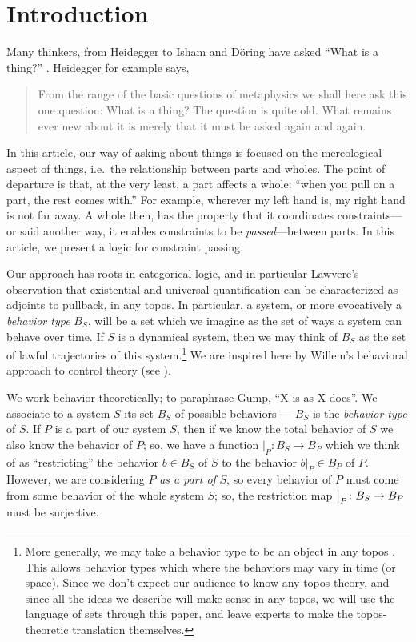 
\section{Introduction}

Many thinkers, from Heidegger to Isham and D\"{o}ring have asked ``What is a thing?'' \cite{heidegger1972thing, doring2010thing}. Heidegger for example says,
\begin{quote}
    From the range of the basic questions of metaphysics we shall here ask this one question: What is a thing? The question is quite old. What remains ever new about it is merely that it must be asked again and again.
\end{quote}
In this article, our way of asking about things is focused on the mereological aspect of things, i.e.\ the relationship between parts and wholes. The point of departure is that, at the very least, a part affects a whole: ``when you pull on a part, the rest comes with.'' For example, wherever my left hand is, my right hand is not far away. A whole then, has the property that it coordinates constraints---or said another way, it enables constraints to be \emph{passed}---between parts. In this article, we present a logic for constraint passing.

Our approach has roots in categorical logic, and in particular Lawvere's
observation that existential and universal quantification can be characterized
as adjoints to pullback, in any topos. In particular, a system, or more
evocatively a \emph{behavior type} $B_S$, will be a set which we imagine as the
set of ways a system can behave over time. If $S$ is a dynamical system, then we
may think of $B_S$ as the set of lawful trajectories of this system.\footnote{More generally, we may take a behavior type to be an object in
  any topos \cite{MacLane.Moerdijk:1992a}. This allows behavior types which
  where the behaviors may vary in time (or space). Since we don't expect our
  audience to know any topos theory, and since all the ideas we describe will
  make sense in any topos, we will use the language of sets through this paper,
  and leave experts to make the topos-theoretic translation themselves.} We are
inspired here by Willem's behavioral approach to control theory (see \cites{Willems:1998a}{Willems:2007a}{Willems.Polderman:2013a}).

We work behavior-theoretically; to paraphrase Gump, ``X is as X does''. We
associate to a system $S$ its set $B_S$ of possible behaviors --- $B_S$ is the
\emph{behavior type} of $S$. If $P$ is a part
of our system $S$, then if we know the total behavior of $S$ we also know the
behavior of $P$; so, we have a function $|_P : B_S \to B_P$ which we think of as
``restricting'' the behavior $b \in B_S$ of $S$ to the behavior $b|_P \in B_P$
of $P$. However, we are considering $P$ \emph{as a part of} $S$, so every
behavior of $P$ must come from some behavior of the whole system $S$; so, the
restriction map $\big|_{P}\colon B_S \to B_P$ must be surjective.

